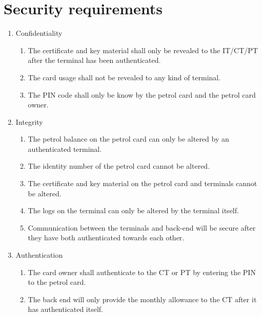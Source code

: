 
\section{Security requirements}

\begin{enumerate}
\item Confidentiality
	\begin{enumerate}
	\item The certificate and key material shall only be revealed to the IT/CT/PT after the terminal has been authenticated.
	\item The card usage shall not be revealed to any kind of terminal.
	\item The PIN code shall only be know by the petrol card and the petrol card owner. 
	\end{enumerate}
\item Integrity
	\begin{enumerate}
	\item The petrol balance on the petrol card can only be altered by an authenticated terminal.
	\item The identity number of the petrol card cannot be altered. 
	\item The certificate and key material on the petrol card and terminals cannot be altered.
	\item The logs on the terminal can only be altered by the terminal itself. 
	\item Communication between the terminals and back-end will be secure after they have both authenticated towards each other.
	\end{enumerate}

\item Authentication
		\begin{enumerate}
		\item The card owner shall authenticate to the CT or PT by entering the PIN to the petrol card.
		\item The back end will only provide the monthly allowance to the CT after it has authenticated itself.


\end{enumerate}
\end{enumerate}
